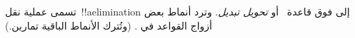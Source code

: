\documentclass[../../../include/open-logic-section]{subfiles}
\begin{document}
تسمى عملية نقل~!!a{elimination} إلى فوق قاعدة~\Elim{\lor} أو
\Elim{\lexists} \emph{تحويل تبديل}. وترد أنماط بعض أزواج القواعد في
. (وتُترك الأنماط الباقية تمارين.)

\end{document}
